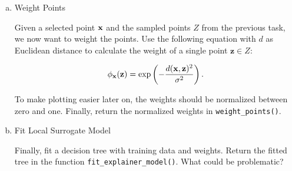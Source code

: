 {\begin{enumerate}[a)]
\item 
Weight Points

Given a selected point $\mathbf{x}$ and the sampled points $Z$ from the previous task, we now want to weight the points. Use the following equation with $d$ as Euclidean distance to calculate the weight of a single point $\mathbf{z} \in Z$:

\begin{equation}
    \phi_{\mathbf{x}}(\mathbf{z}) = \exp \left( -\frac{ d(\mathbf{x}, \mathbf{z})^2 }{\sigma^2} \right).
    \label{eq:dist}
\end{equation}

\noindent To make plotting easier later on, the weights should be normalized between zero and one. Finally, return the normalized weights in \texttt{weight\_points()}.

\item
Fit Local Surrogate Model

Finally, fit a decision tree with training data and weights.
Return the fitted tree in the function \texttt{fit\_explainer\_model()}. 
What could be problematic?

\end{enumerate}
}
